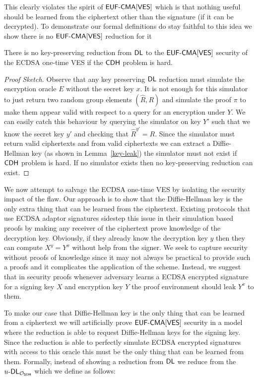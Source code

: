 \newcommand{\SDH}{\textsf{SDH}}
\newcommand{\DLSDH}{\DLOG_{\OSDH}}
\newcommand{\QDLSDH}{\text{-}\DLSDH}
\newcommand{\OSDH}{\mathcal{O}_{\SDH}}

This clearly violates the spirit of $\textsf{EUF-CMA}[\textsf{VES}]$ which is that nothing useful should be learned from the ciphertext other than the signature (if it can be decrypted).
To demonstrate our formal definitions do stay faithful to this idea we show there is no $\textsf{EUF-CMA}[\textsf{VES}]$ reduction for it

\begin{lemma}
  There is no key-preserving reduction from $\textsf{DL}$ to the $\textsf{EUF-CMA}[\textsf{VES}]$ security of the ECDSA one-time VES if the $\textsf{CDH}$ problem is hard.
\end{lemma}
\begin{proof}[Proof Sketch]
  Observe that any key preserving $\textsf{DL}$ reduction must simulate the encryption oracle $E$ without the secret key $x$.
  It is not enough for this simulator to just return two random group elements $(\hat{R}, R)$ and simulate the proof $\pi$ to make them appear valid with respect to a query for an encryption under $Y$.
  We can easily catch this behaviour by querying the simulator on key $Y'$ such that we know the secret key $y'$ and checking that $\hat{R}^{y'} = R$.
  Since the simulator must return valid ciphertexts and from valid ciphertexts we can extract a Diffie-Hellman key (as shown in Lemma~\ref{key-leak}) the simulator must not exist if $\textsf{CDH}$ problem is hard.
  If no simulator exists then no key-preserving reduction can exist.
\end{proof}

We now attempt to salvage the ECDSA one-time VES by isolating the security impact of the flaw.
Our approach is to show that the Diffie-Hellman key is the only extra thing that can be learned from the ciphertext.
Existing protocols that use ECDSA adaptor signatures sidestep this issue in their simulation based proofs by making any receiver of the ciphertext prove knowledge of the decryption key.
Obviously, if they already know the decryption key $y$ then they can compute $X^y = Y^x$ without help from the signer.
We seek to capture security without proofs of knowledge since it may not always be practical to provide such a proofs and it complicates the application of the scheme.
Instead, we suggest that in security proofs whenever adversary learns a ECDSA encrypted signature for a signing key $X$ and encryption key $Y$ the proof environment should leak $Y^x$ to them.

To make our case that Diffie-Hellman key is the only thing that can be learned from a ciphertext we will artificially prove $\textsf{EUF-CMA}[\textsf{VES}]$ security in a model where the reduction is able to request Diffie-Hellman keys for the signing key.
Since the reduction is able to perfectly simulate ECDSA encrypted signatures with access to this oracle this must be the only thing that can be learned from them.
Formally, instead of showing a reduction from $\textsf{DL}$ we reduce from the $u\QDLSDH$ which we define as follows:

